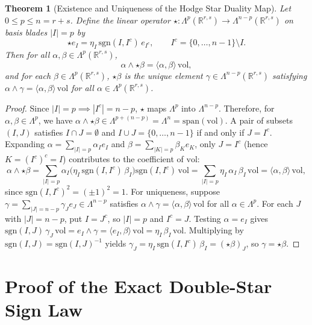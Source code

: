 \documentclass[11pt]{article}
\newtheorem{theorem}{Theorem}[section]
\theoremstyle{definition}
\newcommand{\R}{\mathbb{R}}
\newcommand{\vol}{\mathrm{vol}}
\newcommand{\sgn}{\mathrm{sgn}}
\begin{document}
\begin{theorem}[Existence and Uniqueness of the Hodge Star Duality Map]\label{thm:hodge-duality}
Let $0 \le p \le n = r + s$. Define the linear operator $\star : \Lambda^p(\R^{r,s}) \to \Lambda^{n-p}(\R^{r,s})$ on basis blades $|I| = p$ by
\begin{equation}\label{eq:hodge-basis}
  \star e_I = \eta_I\,\sgn(I, I^c)\,e_{I^c}, \qquad I^c = \{0, \dots, n-1\} \setminus I.
\end{equation}
Then for all $\alpha, \beta \in \Lambda^p(\R^{r,s})$,
\begin{equation}\label{eq:hodge-duality}
  \alpha \wedge \star\beta = \langle \alpha, \beta \rangle\,\vol,
\end{equation}
and for each $\beta \in \Lambda^p(\R^{r,s})$, $\star\beta$ is the \emph{unique} element $\gamma \in \Lambda^{n-p}(\R^{r,s})$ satisfying $\alpha \wedge \gamma = \langle \alpha, \beta \rangle\,\vol$ for all $\alpha \in \Lambda^p(\R^{r,s})$.
\end{theorem}

\begin{proof}
Since $|I| = p \implies |I^c| = n - p$, $\star$ maps $\Lambda^p$ into $\Lambda^{n-p}$. Therefore, for $\alpha, \beta \in \Lambda^p$, we have $\alpha \wedge \star\beta \in \Lambda^{p+(n-p)} = \Lambda^n = \mathrm{span}(\vol)$. A pair of subsets $(I, J)$ satisfies $I \cap J = \emptyset$ and $I \cup J = \{0, \dots, n-1\}$ if and only if $J = I^c$. Expanding $\alpha = \sum_{|I|=p} \alpha_I e_I$ and $\beta = \sum_{|K|=p} \beta_K e_K$, only $J = I^c$ (hence $K = (I^c)^c = I$) contributes to the coefficient of $\vol$:
\[
  \alpha \wedge \star\beta
  = \sum_{|I|=p} \alpha_I \bigl(\eta_I\,\sgn(I, I^c)\,\beta_I\bigr) \sgn(I, I^c)\,\vol
  = \sum_{|I|=p} \eta_I\,\alpha_I\,\beta_I\,\vol
  = \langle \alpha, \beta \rangle\,\vol,
\]
since $\sgn(I, I^c)^2 = (\pm 1)^2 = 1$. For uniqueness, suppose $\gamma = \sum_{|J|=n-p} \gamma_J e_J \in \Lambda^{n-p}$ satisfies $\alpha \wedge \gamma = \langle \alpha, \beta \rangle\,\vol$ for all $\alpha \in \Lambda^p$. For each $J$ with $|J| = n - p$, put $I = J^c$, so $|I| = p$ and $I^c = J$. Testing $\alpha = e_I$ gives $\sgn(I, J)\,\gamma_J\,\vol = e_I \wedge \gamma = \langle e_I, \beta \rangle\,\vol = \eta_I\,\beta_I\,\vol$. Multiplying by $\sgn(I, J) = \sgn(I, J)^{-1}$ yields $\gamma_J = \eta_I\,\sgn(I, I^c)\,\beta_I = (\star\beta)_J$, so $\gamma = \star\beta$.
\end{proof}

\section{Proof of the Exact Double-Star Sign Law}
\end{document}
